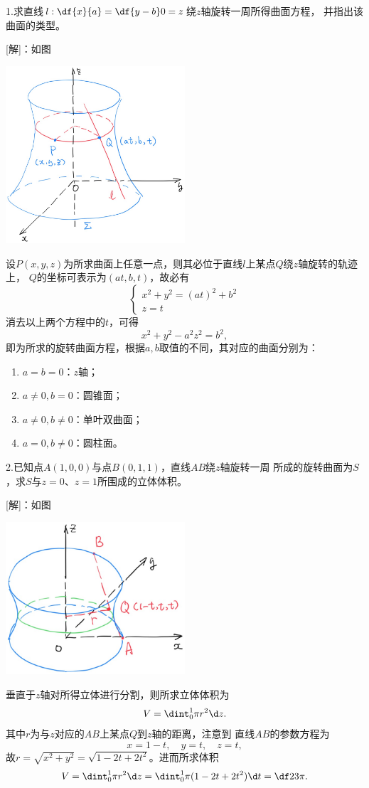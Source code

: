 1.求直线$l:\df{x}{a}=\df{y-b}0=z$绕$z$轴旋转一周所得曲面方程，
并指出该曲面的类型。

[解]：如图
\begin{center}
	\includegraphics[width=0.5\textwidth]{./images/ch8/abz.jpg}
\end{center}
设$P(x,y,z)$为所求曲面上任意一点，则其必位于直线$l$上某点$Q$绕$z$轴旋转的轨迹上，
$Q$的坐标可表示为$(at,b,t)$，故必有
$$\left\{\begin{array}{l}
	x^2+y^2=(at)^2+b^2\\
	z=t
\end{array}\right.$$
消去以上两个方程中的$t$，可得
$$x^2+y^2-a^2z^2=b^2,$$
即为所求的旋转曲面方程，根据$a,b$取值的不同，其对应的曲面分别为：
\begin{enumerate}[(1)]
  \setlength{\itemindent}{1cm}
  \item $a=b=0$：$z$轴；
  \item $a\ne0,b=0$：圆锥面；
  \item $a\ne0,b\ne0$：单叶双曲面；
  \item $a=0,b\ne0$：圆柱面。
\end{enumerate}
\fin

\bs

2.已知点$A(1,0,0)$与点$B(0,1,1)$，直线$AB$绕$z$轴旋转一周
所成的旋转曲面为$S$，求$S$与$z=0$、$z=1$所围成的立体体积。

[解]：如图
\begin{center}
	\includegraphics[width=0.5\textwidth]{./images/ch8/abzz.jpg}
\end{center}
垂直于$z$轴对所得立体进行分割，则所求立体体积为
$$V=\dint_0^1\pi r^2\d z.$$
其中$r$为与$z$对应的$AB$上某点$Q$到$z$轴的距离，注意到
直线$AB$的参数方程为
$$x=1-t,\quad y=t,\quad z=t,$$
故$r=\sqrt{x^2+y^2}=\sqrt{1-2t+2t^2}$。进而所求体积
$$V=\dint_0^1\pi r^2\d z
=\dint_0^1\pi(1-2t+2t^2)\d t=\df23\pi.$$
\fin

